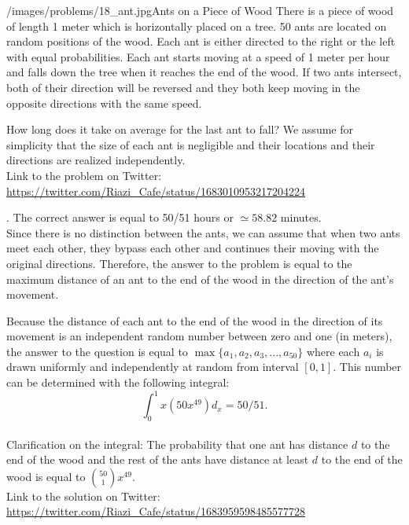 \begin{problem}{/images/problems/18_ant.jpg}{Ants on a Piece of Wood} 
    There is a piece of wood of length 1 meter which is horizontally placed on a tree. 50 ants are located on random positions of the wood. Each ant is either directed to the right or the left with equal probabilities. Each ant starts moving at a speed of 1 meter per hour and falls down the tree when it reaches the end of the wood. If two ants intersect, both of their direction will be reversed and they both keep moving in the opposite directions with the same speed.

How long does it take on average for the last ant to fall? We assume for simplicity that the size of each ant is negligible and their locations and their directions are realized independently. \\[0.2cm]

Link to the problem on Twitter: \url{https://twitter.com/Riazi_Cafe/status/1683010953217204224}
\end{problem}
\begin{solution}.
The correct answer is equal to 50/51 hours or $\simeq 58.82$ minutes.\\[0.2cm]

Since  there is no distinction between the ants, we can assume that when two ants meet each other, they bypass each other and continues their moving with the original directions. Therefore, the answer to the problem is equal to the maximum distance of an ant to the end of the wood in the direction of the ant's movement.

Because the distance of each ant to the end of the wood in the direction of its movement is an independent random number between zero and one (in meters), the answer to the question is equal to $\max\{a_1, a_2, a_3, ..., a_{50}\}$ where each $a_i$ is drawn uniformly and independently at random from interval $[0,1]$. This number can be determined with the following integral:
$$\int_0^1 x(50x^{49}) d_x = 50/51.$$\\

Clarification on the integral: The probability that one ant has distance $d$ to the end of the wood and the rest of the ants have distance at least $d$ to the end of the wood is equal to $\binom{50}{1} x^{49}$.\\[0.2cm]

Link to the solution on Twitter:  \url{https://twitter.com/Riazi_Cafe/status/1683959598485577728}
\end{solution}